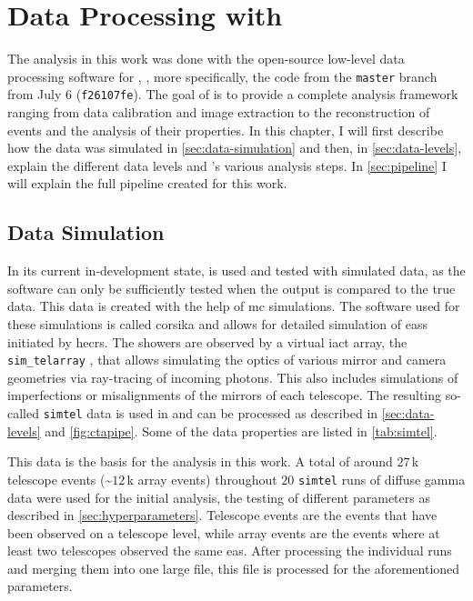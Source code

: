 \chapter{Data Processing with \texorpdfstring{\ctapipe{}}{ctapipe}}
\label{ch:data-processing}

The analysis in this work was done with the open-source low-level data processing software for \cta{},
\ctapipe{} \cite{ctapipe}, more specifically, the code from the \texttt{master} branch from July 6 (\texttt{f26107fe}).
The goal of \ctapipe{} is to provide a complete analysis
framework ranging from data calibration and image extraction to the reconstruction of events and the
analysis of their properties. In this chapter, I will first describe how the data
was simulated in \autoref{sec:data-simulation} and then, in \autoref{sec:data-levels}, explain the different
data levels and \ctapipe{}'s various analysis steps. In \autoref{sec:pipeline} I will
explain the full pipeline created for this work.

\vspace{-0.5cm}
\section{Data Simulation}
\label{sec:data-simulation}

In its current in-development state, \ctapipe{} is used and tested with simulated data, as the software
can only be sufficiently tested when the output is compared to the true data. This data is created with the help of
\gls{mc} simulations. The software used for these simulations is called \gls{corsika} \cite{corsika} and
allows for detailed simulation of \glspl{eas} initiated by \glspl{hecr}. The showers are observed by
a virtual \gls{iact} array, the \texttt{sim\_telarray} \cite{bernlohr2008}, that allows simulating the optics
of various mirror and camera geometries via ray-tracing of incoming photons. This also includes
simulations of imperfections or misalignments of the mirrors of each telescope. The resulting so-called
\texttt{simtel} data is used in \ctapipe{} and can be processed as described in \autoref{sec:data-levels}
and \autoref{fig:ctapipe}. Some of the data properties are listed in \autoref{tab:simtel}.

This data is the basis for the analysis in this work. A total of around \(\num{27}\)\,k telescope events
(\sim\(\num{12}\)\,k array events) throughout \(\num{20}\) \texttt{simtel} runs of diffuse gamma data
were used for the initial analysis, \ie the testing of different parameters as described in
\autoref{sec:hyperparameters}. Telescope events are the events that have been observed on a telescope level,
while array events are the events where at least two telescopes observed the same \gls{eas}.
After processing the individual runs and merging them into one large
file, this file is processed for the aforementioned parameters. %

